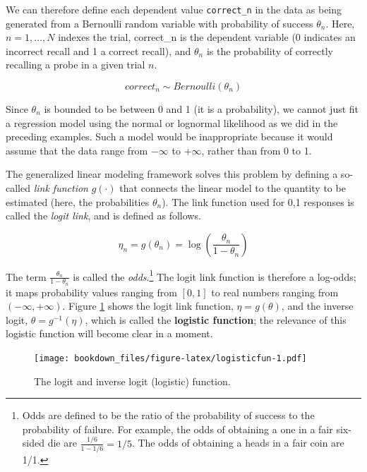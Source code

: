 \documentclass[12pt,]{krantz}
\theoremstyle{definition}
\theoremstyle{definition}
\theoremstyle{definition}
\theoremstyle{remark}
\begin{document}
We can therefore define each dependent value \texttt{correct\_n} in the
data as being generated from a Bernoulli random variable with
probability of success \(\theta_n\). Here, \(n =1, \ldots, N\) indexes
the trial, correct\_n is the dependent variable (0 indicates an
incorrect recall and 1 a correct recall), and \(\theta_n\) is the
probability of correctly recalling a probe in a given trial \(n\).

\begin{equation}
correct_n \sim Bernoulli(\theta_n)
\label{eq:bernoullilik}
\end{equation}

Since \(\theta_n\) is bounded to be between 0 and 1 (it is a
probability), we cannot just fit a regression model using the normal or
lognormal likelihood as we did in the preceding examples. Such a model
would be inappropriate because it would assume that the data range from
\(-\infty\) to \(+\infty\), rather than from 0 to 1.

The generalized linear modeling framework solves this problem by
defining a so-called \emph{link function} \(g(\cdot)\) that connects the
linear model to the quantity to be estimated (here, the probabilities
\(\theta_n\)). The link function used for 0,1 responses is called the
\emph{logit link}, and is defined as follows.

\begin{equation}
\eta_n = g(\theta_n) = \log\left(\frac{\theta_n}{1-\theta_n}\right)
\end{equation}

The term \(\frac{\theta_n}{1-\theta_n}\) is called the
\emph{odds}.\footnote{Odds are defined to be the ratio of the
  probability of success to the probability of failure. For example, the
  odds of obtaining a one in a fair six-sided die are
  \(\frac{1/6}{1-1/6}=1/5\). The odds of obtaining a heads in a fair
  coin are 1/1.} The logit link function is therefore a log-odds; it
maps probability values ranging from \([0,1]\) to real numbers ranging
from \((-\infty,+\infty)\). Figure \ref{fig:logisticfun} shows the logit
link function, \(\eta = g(\theta)\), and the inverse logit,
\(\theta = g^{-1}(\eta)\), which is called the \textbf{logistic
function}; the relevance of this logistic function will become clear in
a moment.

\begin{figure}
\centering
\texttt{[image: bookdown\_files/figure-latex/logisticfun-1.pdf]}
\caption{\label{fig:logisticfun}The logit and inverse logit (logistic)
function.}
\end{figure}
\end{document}
